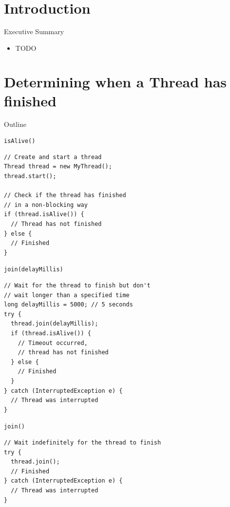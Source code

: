 \section*{Introduction}

\begin{frame}{Executive Summary}
  \begin{itemize}
  \item TODO
  \end{itemize}
\end{frame}


\section{Determining when a Thread has finished}

\begin{frame}{Outline}
  \tableofcontents[current]
\end{frame}

\begin{frame}[fragile]{\lstinline{isAlive()}}
\begin{lstlisting}
// Create and start a thread 
Thread thread = new MyThread(); 
thread.start(); 

// Check if the thread has finished 
// in a non-blocking way 
if (thread.isAlive()) { 
  // Thread has not finished 
} else { 
  // Finished 
} 
\end{lstlisting}
\end{frame}

\begin{frame}[fragile]{\lstinline{join(delayMillis)}}
\begin{lstlisting}
// Wait for the thread to finish but don't 
// wait longer than a specified time 
long delayMillis = 5000; // 5 seconds 
try { 
  thread.join(delayMillis); 
  if (thread.isAlive()) { 
    // Timeout occurred, 
    // thread has not finished 
  } else { 
    // Finished 
  } 
} catch (InterruptedException e) { 
  // Thread was interrupted 
} 
\end{lstlisting}
\end{frame}

\begin{frame}[fragile]{\lstinline{join()}}
\begin{lstlisting}
// Wait indefinitely for the thread to finish 
try { 
  thread.join(); 
  // Finished 
} catch (InterruptedException e) { 
  // Thread was interrupted 
} 
\end{lstlisting}
\end{frame}


